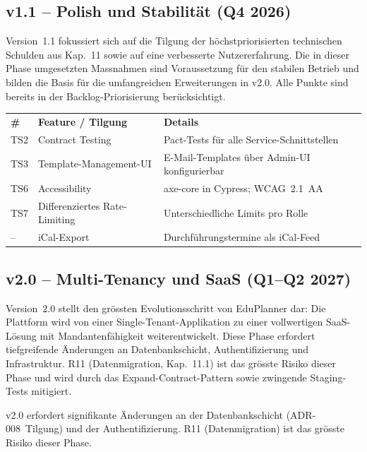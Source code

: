 \subsection{v1.1 -- Polish und Stabilität (Q4 2026)}

Version~1.1 fokussiert sich auf die Tilgung der höchstpriorisierten technischen Schulden aus Kap.~11 sowie auf eine verbesserte Nutzererfahrung. Die in dieser Phase umgesetzten Massnahmen sind Voraussetzung für den stabilen Betrieb und bilden die Basis für die umfangreichen Erweiterungen in v2.0. Alle Punkte sind bereits in der Backlog-Priorisierung berücksichtigt.

\begin{tabularx}{\textwidth}{C{0.8cm} L{4cm} X}
  \color{white}\textbf{\#} & \color{white}\textbf{Feature / Tilgung} & \color{white}\textbf{Details} \\
  TS2 & Contract Testing & Pact-Tests für alle Service-Schnittstellen \\
  TS3 & Template-Management-UI & E-Mail-Templates über Admin-UI konfigurierbar \\
  TS6 & Accessibility & axe-core in Cypress; WCAG~2.1~AA \\
  TS7 & Differenziertes Rate-Limiting & Unterschiedliche Limits pro Rolle \\
  -- & iCal-Export & Durchführungstermine als iCal-Feed \\
\end{tabularx}

\subsection{v2.0 -- Multi-Tenancy und SaaS (Q1--Q2 2027)}

Version~2.0 stellt den grössten Evolutionsschritt von EduPlanner dar: Die Plattform wird von einer Single-Tenant-Applikation zu einer vollwertigen SaaS-Lösung mit Mandantenfähigkeit weiterentwickelt. Diese Phase erfordert tiefgreifende Änderungen an Datenbankschicht, Authentifizierung und Infrastruktur. R11 (Datenmigration, Kap.~11.1) ist das grösste Risiko dieser Phase und wird durch das Expand-Contract-Pattern sowie zwingende Staging-Tests mitigiert.

\begin{korrektur}[Architekturhinweis v2.0]
  v2.0 erfordert signifikante Änderungen an der Datenbankschicht (ADR-008~Tilgung) und der Authentifizierung.
  R11 (Datenmigration) ist das grösste Risiko dieser Phase.
\end{korrektur}

